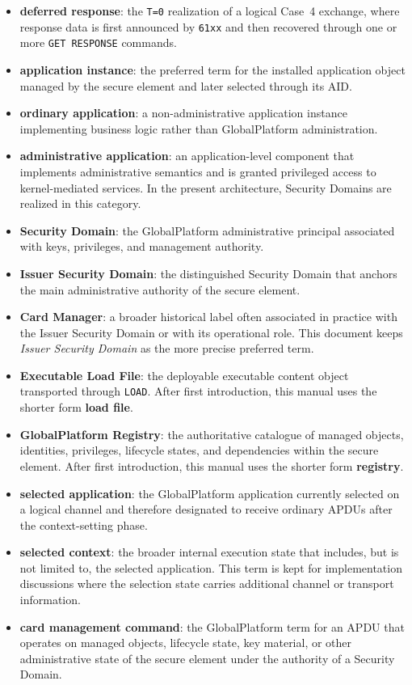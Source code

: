 \begin{itemize}
  transport defined by ISO/IEC~7816-3.
\item \textbf{deferred response}: the \texttt{T=0} realization of a logical
  Case~4 exchange, where response data is first announced by \texttt{61xx} and
  then recovered through one or more \texttt{GET RESPONSE} commands.
\item \textbf{application instance}: the preferred term for the installed
  application object managed by the secure element and later selected through
  its AID.
\item \textbf{ordinary application}: a non-administrative application instance
  implementing business logic rather than GlobalPlatform administration.
\item \textbf{administrative application}: an application-level component that
  implements administrative semantics and is granted privileged access to
  kernel-mediated services. In the present architecture, Security Domains are
  realized in this category.
\item \textbf{Security Domain}: the GlobalPlatform administrative principal
  associated with keys, privileges, and management authority.
\item \textbf{Issuer Security Domain}: the distinguished Security Domain that
  anchors the main administrative authority of the secure element.
\item \textbf{Card Manager}: a broader historical label often associated in
  practice with the Issuer Security Domain or with its operational role. This
  document keeps \emph{Issuer Security Domain} as the more precise preferred
  term.
\item \textbf{Executable Load File}: the deployable executable content object
  transported through \texttt{LOAD}. After first introduction, this manual uses
  the shorter form \textbf{load file}.
\item \textbf{GlobalPlatform Registry}: the authoritative catalogue of managed
  objects, identities, privileges, lifecycle states, and dependencies within
  the secure element. After first introduction, this manual uses the shorter
  form \textbf{registry}.
\item \textbf{selected application}: the GlobalPlatform application currently
  selected on a logical channel and therefore designated to receive ordinary
  APDUs after the context-setting phase.
\item \textbf{selected context}: the broader internal execution state that
  includes, but is not limited to, the selected application. This term is kept
  for implementation discussions where the selection state carries additional
  channel or transport information.
\item \textbf{card management command}: the GlobalPlatform term for an APDU
  that operates on managed objects, lifecycle state, key material, or other
  administrative state of the secure element under the authority of a Security
  Domain.
\end{itemize}

